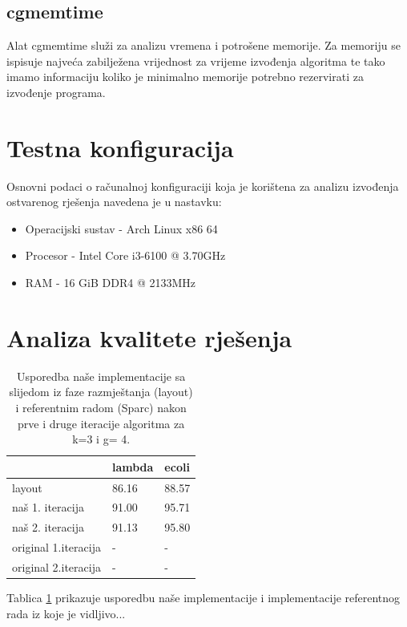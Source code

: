 \documentclass[times, utf8, seminar, numeric]{fer}
\begin{document}
\subsection{cgmemtime}
Alat cgmemtime služi za analizu vremena i potrošene memorije. Za memoriju se ispisuje najveća zabilježena vrijednost za vrijeme izvođenja algoritma te tako imamo informaciju koliko je minimalno memorije potrebno rezervirati za izvođenje programa.


\section{Testna konfiguracija}
Osnovni podaci o računalnoj konfiguraciji koja je korištena za analizu izvođenja ostvarenog rješenja navedena je u nastavku:
\renewcommand{\labelitemi}{$\bullet$}
\begin{itemize}
	\item Operacijski sustav - Arch Linux x86 64
	\item Procesor - Intel Core i3-6100 @ 3.70GHz
	\item RAM - 16 GiB DDR4 @ 2133MHz
\end{itemize}

\section{Analiza kvalitete rješenja}
\begin{table}[htb]
	\centering
	\begin{tabular}{l|ll}
		& \multicolumn{1}{l}{lambda} & ecoli \\ 	\hline
		layout 				& 86.16 	& 88.57 \\ 	\hline
		naš 1. iteracija  	& 91.00     & 95.71 \\	\hline
		naš 2. iteracija  	& 91.13     & 95.80 \\	\hline
		original 1.iteracija   &    -         & -\\ \hline
		original 2.iteracija   &    -         & -
	\end{tabular}
	\caption{Usporedba naše implementacije sa slijedom iz faze razmještanja (layout) i referentnim radom (Sparc) nakon prve i druge iteracije algoritma za k=3 i g= 4.}
	\label{table:kvaliteta}
\end{table}

Tablica \ref{table:kvaliteta} prikazuje usporedbu naše implementacije i implementacije referentnog rada iz koje je vidljivo...
\end{document}
